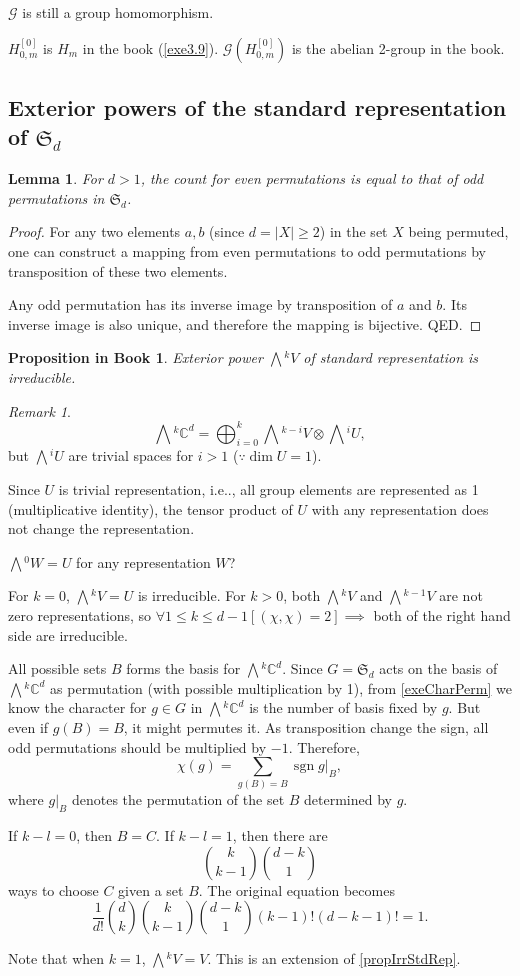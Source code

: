 \documentclass[12pt, letterpaper]{article}
\makeatletter
\newcommand{\co}{\mathbb{C}}
\newcommand{\sgn}{\operatorname{sgn}}
\newcommand{\ext}[1]{\bigwedge\!^{#1}}
\newcommand\ie{i.e\@ifnextchar.{}{.\@}}
\newcommand{\red}[1]{{\color{red} #1}}
\newcommand{\blue}[1]{{\color{blue} #1}}
\newcommand{\card}[1]{\left\lvert #1 \right\rvert}
\newtheorem{lem}[prop]{Lemma}
\theoremstyle{definition}
\theoremstyle{remark}
\newtheorem*{rem*}{Remark}
\theoremstyle{definition}
\theoremstyle{plain}
\newtheorem{pprop}[exe]{Proposition in Book}
\numberwithin{equation}{section}
\makeatother
\begin{document}
	$\mathcal{G}$ is still a group homomorphism.
	
	\blue{$H_{0,m}^{[0]}$ is $H_m$ in the book (\ref{exe3.9}). $\mathcal{G}(H_{0,m}^{[0]})$ is the abelian 2-group in the book.}
	
	\subsection{Exterior powers of the standard representation of $\mathfrak{S}_d$}
	\begin{lem}
		For $d>1$, the count for even permutations is equal to that of odd permutations in $\mathfrak{S}_d$.
	\end{lem}
	\begin{proof}
		For any two elements $a, b$ (since $d=\card{X}\ge 2$) in the set $X$ being permuted,
		one can construct a mapping from even permutations to odd permutations
		by transposition of these two elements.

		Any odd permutation has its inverse image by transposition of $a$ and $b$.
		Its inverse image is also unique, and therefore the mapping is bijective. QED.
	\end{proof}
	\begin{pprop}
		Exterior power $\ext{k}V$ of standard representation is irreducible.
	\end{pprop}
	\begin{rem*}
		\[\ext{k}\co^d=\bigoplus_{i=0}^{k}\ext{k-i}V\otimes\ext{i}U,\]
		but $\ext{i}U$ are trivial spaces for $i>1$ ($\because\dim U = 1$).
		
		Since $U$ is trivial representation, \ie, all group elements are represented as 1 (multiplicative identity),
		the tensor product of $U$ with any representation does not change the representation.
		
		\red{$\ext{0}W=U$ for any representation $W$?}
		
		For $k=0$, $\ext{k}V=U$ is irreducible. For $k>0$, both $\ext{k}V$ and $\ext{k-1}V$ are not zero representations,
		so $\forall 1\le k\le d-1[(\chi,\chi)=2]\implies$ both of the right hand side are irreducible.
		
		All possible sets $B$ forms the basis for $\ext{k}\co^{d}$. Since $G=\mathfrak{S}_d$ acts on the basis of $\ext{k}\co^d$ as permutation (with possible multiplication by 1), from \ref{exeCharPerm} we know the character for $g\in G$ in $\ext{k}\co^{d}$ is the number of basis fixed by $g$. But even if $g(B)=B$, it might permutes it. As transposition change the sign, all odd permutations should be multiplied by $-1$. Therefore,
		\[\chi(g)=\sum_{g(B)=B} \sgn g|_{B},\]
		where $g|_{B}$ denotes the permutation of the set $B$ determined by $g$.
		
		If $k-l=0$, then $B=C$. If $k-l=1$, then there are
		\[\binom{k}{k-1}\binom{d-k}{1} \]
		ways to choose $C$ given a set $B$. The original equation becomes
		\[\frac{1}{d!} \binom{d}{k} \binom{k}{k-1}\binom{d-k}{1}(k-1)!(d-k-1)!=1. \]
		
		Note that when $k=1$, $\ext{k}V=V$. This is an extension of \ref{propIrrStdRep}.
	\end{rem*}
\end{document}
